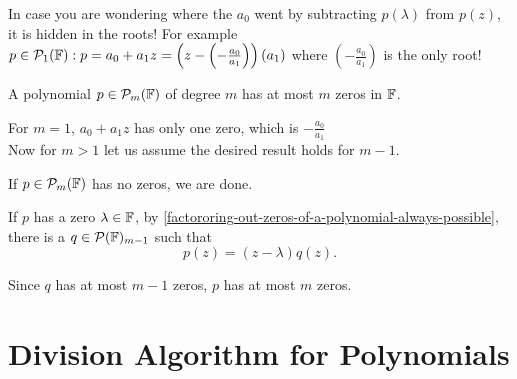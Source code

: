 In case you are wondering where the $a_0$ went by subtracting $p(\lambda)$ from $p(z)$, it is hidden in the roots! For example $p\in \mathcal{P}_1(\mathbb{F}): p=a_0+a_1z = \left(z- \left(-\frac{a_0}{a_1}\right)\right)(a_1)$ where $\left(-\frac{a_0}{a_1}\right)$ is the only root!

\setcounter{thm}{7}
\begin{thm}
  \label{thm: a polynomial of degree m has at most m zeros}
  A polynomial $p \in \mathcal{P}_m(\mathbb{F})$ of degree $m$ has at most $m$ zeros in $\mathbb{F}$.
\end{thm}
\begin{prf}
  For $m=1$, $a_0+a_1z$ has only one zero, which is $-\frac{a_0}{a_1}$\\
  Now for $m>1$ let us assume the desired result holds for $m-1$.

  If $p\in \mathcal{P}_{m}(\mathbb{F})$ has no zeros, we are done.

  If $p$ has a zero $\lambda \in \mathbb{F}$, by \ref{factororing-out-zeros-of-a-polynomial-always-possible}, there is a $q \in \mathcal{P}(\mathbb{F})_{m-1}$ such that
  \begin{equation}
  	p(z)=(z-\lambda)q(z).
  \end{equation}

  Since $q$ has at most $m-1$ zeros, $p$ has at most $m$ zeros.
\end{prf}

\section{Division Algorithm for Polynomials}


